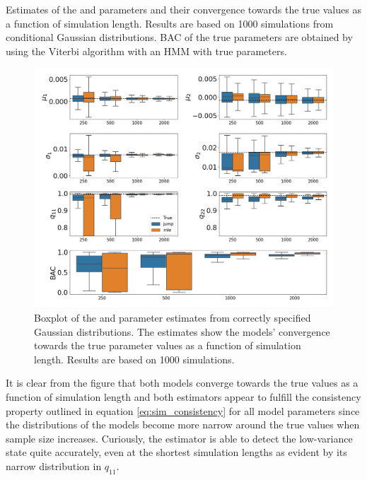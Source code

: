 \begin{table}[H]
\centering
\caption[Estimates from conditional Gaussian distributions of the \mle and \jump parameters and their convergence towards the true values]{Estimates of the \mle and \jump parameters and their convergence towards the true values as a function of simulation length. Results are based on 1000 simulations from conditional Gaussian distributions. BAC of the true parameters are obtained by using the Viterbi algorithm with an HMM with true parameters.}

\label{tab:jump_gaussian}
\end{table}

\begin{figure}[H] 
    \centering
    \includegraphics[width=1\textwidth]{analysis/model_convergence/images/simulation_normal_box.png}
    \caption[Boxplot of \mle and \jump parameter estimates from correctly specified conditional Gaussian distributions]{Boxplot of the \mle and \jump parameter estimates from correctly specified Gaussian distributions. The estimates show the models' convergence towards the true parameter values as a function of simulation length. Results are based on 1000 simulations.}
    \label{fig:jump_normal_box}
\end{figure}

It is clear from the figure that both models converge towards the true values as a function of simulation length and both estimators appear to fulfill the consistency property outlined in equation \ref{eq:sim_consistency} for all model parameters since the distributions of the models become more narrow around the true values when sample size increases. Curiously, the \jump estimator is able to detect the low-variance state quite accurately, even at the shortest simulation lengths as evident by its narrow distribution in $q_{11}$.

